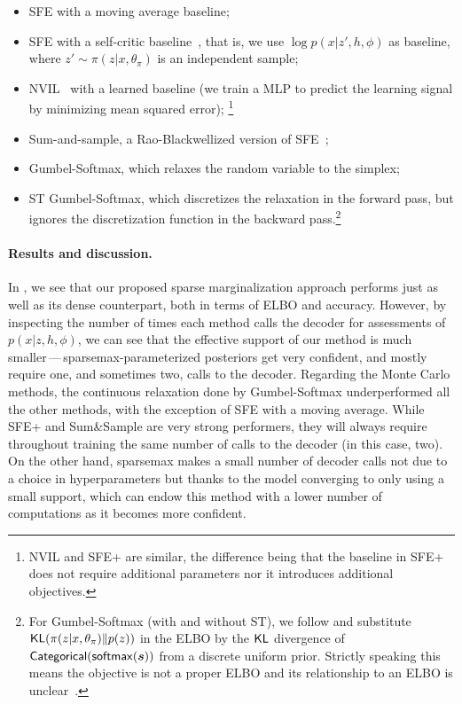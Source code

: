 \begin{itemize}
    \item SFE with a moving average baseline;
    \item SFE with a self-critic
          baseline~\citep[SFE+;][]{rennie2017self}, that is, we use $\log
              p(x|z', h, \phi)$ as baseline, where $z' \sim \pi(z|x, \theta_\pi)$
          is an independent sample;
    \item NVIL~\citep{mnih2014neural}
          with a learned baseline (we train a MLP to predict the learning
          signal by minimizing mean squared error);
          \footnote{NVIL and SFE+ are
              similar, the difference being that the baseline in SFE+ does not
              require additional parameters nor it introduces additional
              objectives.}
    \item Sum-and-sample, a Rao-Blackwellized
          version of SFE~\citep{RB19};
    \item Gumbel-Softmax, which relaxes the random variable to the simplex;
    \item ST Gumbel-Softmax, which discretizes the relaxation in
          the forward pass, but ignores the discretization function in the
          backward pass.\footnote{\label{note:GS} For Gumbel-Softmax (with and
              without ST), we follow \citet{GumbelSoftmax} and substitute
              $\operatorname{\mathsf{KL}}(\pi(z|x, \theta_\pi) \| p(z))$ in the ELBO by the $\operatorname{\mathsf{KL}}$
              divergence of $\operatorname{\mathsf{Categorical}}(\operatorname*{\mathsf{softmax}}(\bm{s}))$ from a discrete uniform prior.
              Strictly speaking this means the objective is not a proper ELBO and
              its relationship to an ELBO is unclear~\citep[Appendix
                  C.2]{Concrete}.}
\end{itemize}

\paragraph*{Results and discussion.}

In , we see that our proposed sparse
marginalization approach performs just as well as its dense
counterpart, both in terms of ELBO and accuracy. However, by
inspecting the number of times each method calls the decoder for
assessments of $p(x|z, h,\phi)$, we can see that the effective
support of our method is much smaller\,---\,sparsemax-parameterized
posteriors get very confident, and mostly require one, and sometimes
two, calls to the decoder. Regarding the Monte Carlo methods, the
continuous relaxation done by Gumbel-Softmax underperformed all the
other methods, with the exception of SFE with a moving average. While
SFE+ and Sum\&Sample are very strong performers, they will always
require throughout training the same number of calls to the decoder
(in this case, two). On the other hand, sparsemax makes a small
number of decoder calls not due to a choice in hyperparameters but
thanks to the model converging to only using a small support, which
can endow this method with a lower number of computations as it
becomes more confident.

